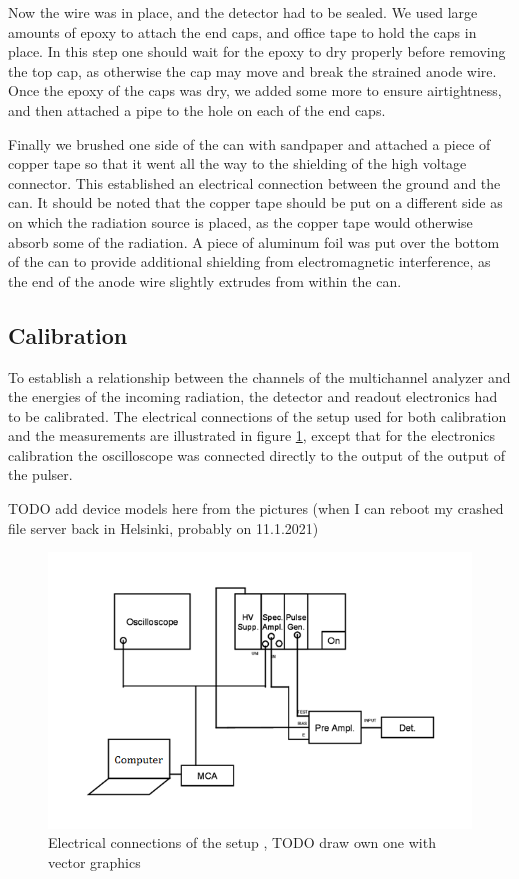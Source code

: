 \documentclass[a4paper]{article}
\begin{document}
Now the wire was in place, and the detector had to be sealed.
We used large amounts of epoxy to attach the end caps, and office tape to hold the caps in place.
In this step one should wait for the epoxy to dry properly before removing the top cap, as otherwise the cap may move and break the strained anode wire.
Once the epoxy of the caps was dry, we added some more to ensure airtightness, and then attached a pipe to the hole on each of the end caps.

Finally we brushed one side of the can with sandpaper and attached a piece of copper tape so that it went all the way to the shielding of the high voltage connector.
This established an electrical connection between the ground and the can.
It should be noted that the copper tape should be put on a different side as on which the radiation source is placed, as the copper tape would otherwise absorb some of the radiation.
A piece of aluminum foil was put over the bottom of the can to provide additional shielding from electromagnetic interference, as the end of the anode wire slightly extrudes from within the can.


\clearpage
\subsection{Calibration}
\label{setup_calibration}
To establish a relationship between the channels of the multichannel analyzer and the energies of the incoming radiation, the detector and readout electronics had to be calibrated.
The electrical connections of the setup used for both calibration and the measurements are illustrated in figure \ref{fig:connections}, except that for the electronics calibration the oscilloscope was connected directly to the output of the output of the pulser.

TODO add device models here from the pictures (when I can reboot my crashed file server back in Helsinki, probably on 11.1.2021)

\begin{figure}[ht!]
\centering
\includegraphics[width=\textwidth]{fig/instructions/connections.png}
\caption{Electrical connections of the setup \cite{instructions}, TODO draw own one with vector graphics}
\label{fig:connections}
\end{figure}
\end{document}
